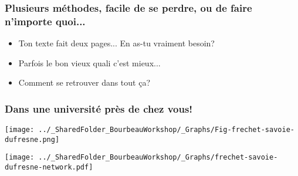 \documentclass{beamer}
\begin{document}
     
 \begin{frame}
      
      \frametitle{Plusieurs méthodes, facile de se perdre, ou de faire n'importe quoi...} \vspace{1cm}
 
           \begin{itemize}
 
                \item Ton texte fait deux pages... En as-tu vraiment besoin?
      
                 \item Parfois le bon vieux quali c'est mieux...
 
                  \item Comment se retrouver dans tout ça? 
 
        \end{itemize}
 
 \end{frame}



\begin{frame}

       \frametitle{Dans une université près de chez vous!} \vspace{1cm}

          \begin{center}

            \texttt{[image: ../\_SharedFolder\_BourbeauWorkshop/\_Graphs/Fig-frechet-savoie-dufresne.png]}
            
       \end{center}

\end{frame}


 \begin{frame}
 
 
       \begin{center}
 
            \texttt{[image: ../\_SharedFolder\_BourbeauWorkshop/\_Graphs/frechet-savoie-dufresne-network.pdf]}
    
       \end{center}
 
 
 \end{frame}
 
\end{document}
